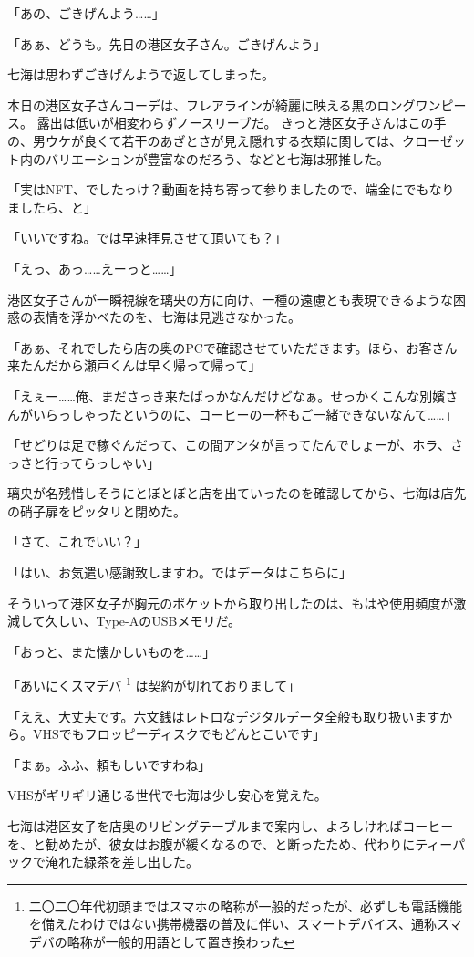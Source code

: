 「あの、ごきげんよう……」

「あぁ、どうも。先日の港区女子さん。ごきげんよう」

七海は思わずごきげんようで返してしまった。

本日の港区女子さんコーデは、フレアラインが綺麗に映える黒のロングワンピース。
露出は低いが相変わらずノースリーブだ。
きっと港区女子さんはこの手の、男ウケが良くて若干のあざとさが見え隠れする衣類に関しては、クローゼット内のバリエーションが豊富なのだろう、などと七海は邪推した。

「実はNFT、でしたっけ？動画を持ち寄って参りましたので、端金にでもなりましたら、と」

「いいですね。では早速拝見させて頂いても？」

「えっ、あっ……えーっと……」

港区女子さんが一瞬視線を璃央の方に向け、一種の遠慮とも表現できるような困惑の表情を浮かべたのを、七海は見逃さなかった。

「あぁ、それでしたら店の奥のPCで確認させていただきます。ほら、お客さん来たんだから瀬戸くんは早く帰って帰って」

「えぇー……俺、まださっき来たばっかなんだけどなぁ。せっかくこんな別嬪さんがいらっしゃったというのに、コーヒーの一杯もご一緒できないなんて……」

「せどりは足で稼ぐんだって、この間アンタが言ってたんでしょーが、ホラ、さっさと行ってらっしゃい」

璃央が名残惜しそうにとぼとぼと店を出ていったのを確認してから、七海は店先の硝子扉をピッタリと閉めた。

「さて、これでいい？」

「はい、お気遣い感謝致しますわ。ではデータはこちらに」

そういって港区女子が胸元のポケットから取り出したのは、もはや使用頻度が激減して久しい、Type-AのUSBメモリだ。

「おっと、また懐かしいものを……」

「あいにくスマデバ
  \footnote{二〇二〇年代初頭まではスマホの略称が一般的だったが、必ずしも電話機能を備えたわけではない携帯機器の普及に伴い、スマートデバイス、通称スマデバの略称が一般的用語として置き換わった}
  は契約が切れておりまして」

「ええ、大丈夫です。六文銭はレトロなデジタルデータ全般も取り扱いますから。VHSでもフロッピーディスクでもどんとこいです」

「まぁ。ふふ、頼もしいですわね」

VHSがギリギリ通じる世代で七海は少し安心を覚えた。

七海は港区女子を店奥のリビングテーブルまで案内し、よろしければコーヒーを、と勧めたが、彼女はお腹が緩くなるので、と断ったため、代わりにティーパックで淹れた緑茶を差し出した。

